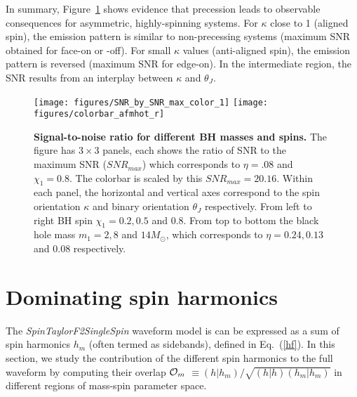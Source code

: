 \documentclass[preprint,onecolumn,,tightenlines,superscriptaddress,showpacs,nofootinbib,eqsecnum,amsfonts,amsmath]{revtex4}
\begin{document}

In summary, Figure~\ref{snr_plot} shows evidence that precession leads to observable consequences for asymmetric, highly-spinning systems. For $\kappa$ close to 1 (aligned spin), the emission pattern is similar to non-precessing systems (maximum SNR obtained for face-on or -off). For small $\kappa$ values (anti-aligned spin), the emission pattern is reversed (maximum SNR for edge-on). In the intermediate region, the SNR results from an interplay between $\kappa$ and $\theta_J$.

\begin{figure}[!hbt]
\centering
{
\texttt{[image: figures/SNR\_by\_SNR\_max\_color\_1]}
\hspace{.1cm}
\texttt{[image: figures/colorbar\_afmhot\_r]}
} 
\caption{\textbf{Signal-to-noise ratio for different BH masses and spins.} The figure has $3 \times 3$ panels, each shows the ratio of SNR to the 
maximum SNR ($SNR_{max}$) which corresponds to $\eta=.08$ and $\chi_1=0.8$. 
The colorbar is scaled by this $SNR_{max}=20.16$. Within each panel, the horizontal and vertical axes correspond to the spin orientation $\kappa$ and binary 
orientation $\theta_J$ respectively. From left to right BH spin $\chi_1 = 0.2, 0.5$ and $0.8$. From top 
to bottom the black hole mass $m_{1} = 2, 8$ and $14 M_{\odot}$, which corresponds to $\eta = 0.24, 0.13$ and $0.08$ respectively. 
}
\label{snr_plot}
\end{figure}
\section{Dominating spin harmonics}\label{III}

The {\it SpinTaylorF2SingleSpin} waveform model is can be expressed as a sum of
spin harmonics $h_m$ (often termed as sidebands), defined in Eq.~(\ref{hf}). In
this section, we study the contribution of the different spin harmonics to the
full waveform by computing their overlap ${\cal{O}}_{m}$ $\equiv (h | h_m) /
\sqrt{ (h | h) (h_m | h_m)} $ in different regions of mass-spin parameter space.
\end{document}
